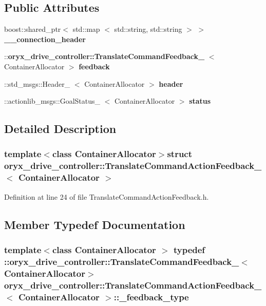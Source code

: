 \subsection*{\-Public \-Attributes}
\begin{DoxyCompactItemize}
\item 
boost\-::shared\-\_\-ptr$<$ std\-::map\*
$<$ std\-::string, std\-::string $>$ $>$ {\bf \-\_\-\-\_\-connection\-\_\-header}
\item 
\-::{\bf oryx\-\_\-drive\-\_\-controller\-::\-Translate\-Command\-Feedback\-\_\-}\*
$<$ \-Container\-Allocator $>$ {\bf feedback}
\item 
\-::std\-\_\-msgs\-::\-Header\-\_\-\*
$<$ \-Container\-Allocator $>$ {\bf header}
\item 
\-::actionlib\-\_\-msgs\-::\-Goal\-Status\-\_\-\*
$<$ \-Container\-Allocator $>$ {\bf status}
\end{DoxyCompactItemize}


\subsection{\-Detailed \-Description}
\subsubsection*{template$<$class Container\-Allocator$>$struct oryx\-\_\-drive\-\_\-controller\-::\-Translate\-Command\-Action\-Feedback\-\_\-$<$ Container\-Allocator $>$}



\-Definition at line 24 of file \-Translate\-Command\-Action\-Feedback.\-h.



\subsection{\-Member \-Typedef \-Documentation}
\subsubsection[{\-\_\-feedback\-\_\-type}]{\setlength{\rightskip}{0pt plus 5cm}template$<$class Container\-Allocator $>$ typedef \-::{\bf oryx\-\_\-drive\-\_\-controller\-::\-Translate\-Command\-Feedback\-\_\-}$<$\-Container\-Allocator$>$ {\bf oryx\-\_\-drive\-\_\-controller\-::\-Translate\-Command\-Action\-Feedback\-\_\-}$<$ \-Container\-Allocator $>$\-::{\bf \-\_\-feedback\-\_\-type}}\label{structoryx__drive__controller_1_1TranslateCommandActionFeedback___a17fe71c838a9829a77c53e89b39dd111}



